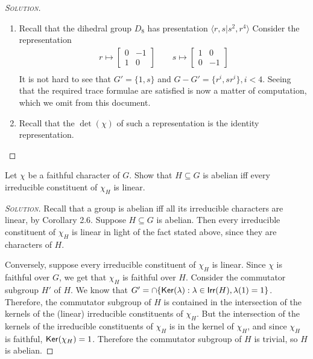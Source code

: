 \begin{proof}[{\scshape Solution}]
  \hfill
  \begin{enumerate}[font=\normalfont,label=\textbf{(\Alph*)}, wide]
    \item
    Recall that the dihedral group $D_8$ has presentation $\langle r, s | s^2, r^4 \rangle$
    Consider the representation
    \[
      \begin{aligned}
        r \mapsto
        \begin{bmatrix}
          0 & -1 \\
          1 &  0
        \end{bmatrix}
        \qquad
        s \mapsto
        \begin{bmatrix}
          1 & 0 \\
          0 & -1
        \end{bmatrix}
        \\
      \end{aligned}
    \]
    It is not hard to see that $G' = \{1, s\}$ and $G-G' = \{r^i, sr^i\}, i < 4$. Seeing that the required trace formulae are satisfied is now a matter of computation, which we omit from this document.

    \item Recall that the $\det(\chi)$ of such a representation is the identity representation.
  \end{enumerate}
\end{proof}

\newpage
\begin{problem}[2.8]
Let $\chi$ be a faithful character of $G$. Show that $H \subseteq G$ is abelian iff every irreducible constituent of $\chi_H$ is linear.
\end{problem}

\begin{proof}[{\scshape Solution}]
Recall that a group is abelian iff all its irreducible characters are linear, by Corollary 2.6. Suppose $H \subseteq G$ is abelian. Then every irreducible constituent of $\chi_H$ is linear in light of the fact stated above, since they are characters of $H$.

Conversely, suppose every irreducible constituent of $\chi_H$ is linear. Since $\chi$ is faithful over $G$, we get that $\chi_H$ is faithful over $H$. Consider the commutator subgroup $H'$ of $H$. We know that $G' = \cap\{\mathsf{Ker}(\lambda) : \lambda \in \mathsf{Irr}(H), \lambda(1) = 1\}$. Therefore, the commutator subgroup of $H$ is contained in the intersection of the kernels of the (linear) irreducible constituents of $\chi_H$. But the intersection of the kernels of the irreducible constituents of $\chi_H$ is in the kernel of $\chi_H$, and since $\chi_H$ is faithful, $\mathsf{Ker}(\chi_H) = 1$. Therefore the commutator subgroup of $H$ is trivial, so $H$ is abelian.
\end{proof}

